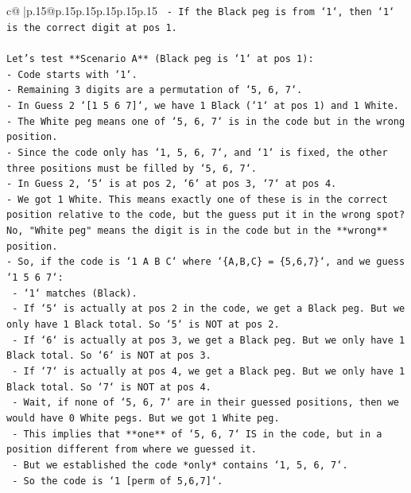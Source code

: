 \documentclass{article}
\begin{document}
{\begin{supertabular}{c@{$\;$}|p{.15\linewidth}@{}p{.15\linewidth}p{.15\linewidth}p{.15\linewidth}p{.15\linewidth}p{.15\linewidth}}
{{{\texttt{        {-}   If the Black peg is from `1`, then `1` is the correct digit at pos 1.} \\
\\ 
\texttt{Let's test **Scenario A** (Black peg is `1` at pos 1):} \\
\texttt{{-}   Code starts with `1`.} \\
\texttt{{-}   Remaining 3 digits are a permutation of `5, 6, 7`.} \\
\texttt{{-}   In Guess 2 `{[}1 5 6 7{]}`, we have 1 Black (`1` at pos 1) and 1 White.} \\
\texttt{{-}   The White peg means one of `5, 6, 7` is in the code but in the wrong position.} \\
\texttt{{-}   Since the code only has `1, 5, 6, 7`, and `1` is fixed, the other three positions must be filled by `5, 6, 7`.} \\
\texttt{{-}   In Guess 2, `5` is at pos 2, `6` at pos 3, `7` at pos 4.} \\
\texttt{{-}   We got 1 White. This means exactly one of these is in the correct position relative to the code, but the guess put it in the wrong spot? No, "White peg" means the digit is in the code but in the **wrong** position.} \\
\texttt{{-}   So, if the code is `1 A B C` where `\{A,B,C\} = \{5,6,7\}`, and we guess `1 5 6 7`:} \\
\texttt{    {-}   `1` matches (Black).} \\
\texttt{    {-}   If `5` is actually at pos 2 in the code, we get a Black peg. But we only have 1 Black total. So `5` is NOT at pos 2.} \\
\texttt{    {-}   If `6` is actually at pos 3, we get a Black peg. But we only have 1 Black total. So `6` is NOT at pos 3.} \\
\texttt{    {-}   If `7` is actually at pos 4, we get a Black peg. But we only have 1 Black total. So `7` is NOT at pos 4.} \\
\texttt{    {-}   Wait, if none of `5, 6, 7` are in their guessed positions, then we would have 0 White pegs. But we got 1 White peg.} \\
\texttt{    {-}   This implies that **one** of `5, 6, 7` IS in the code, but in a position different from where we guessed it.} \\
\texttt{    {-}   But we established the code *only* contains `1, 5, 6, 7`.} \\
\texttt{    {-}   So the code is `1 {[}perm of 5,6,7{]}`.} \\
}}}
\end{supertabular}}
\end{document}
